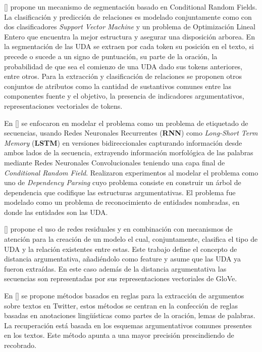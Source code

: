 [\cite{stab2017parsing}] propone un mecanismo de segmentación basado en Conditional Random Fields. La clasificación
y predicción de relaciones es modelado conjuntamente como con dos clasificadores \emph{Support Vector Machine} y un problema
de Optimización Lineal Entero que encuentra la mejor estructura y asegurar una disposición arborea. En la segmentación
de las UDA se extraen por cada token su posición en el texto, si precede o sucede a un signo de puntuación, su parte de
la oración, la probabilidad de que sea el comienzo de una UDA dado sus tokens anteriores, entre otros. Para la extracción
y clasificación de relaciones se proponen otros conjuntos de atributos como la cantidad de sustantivos comunes entre
las componentes fuente y el objetivo, la presencia de indicadores argumentativos, representaciones vectoriales de tokens.

En [\cite{eger2017neural}] se enfocaron en
modelar el problema como un problema de etiquetado de secuencias, usando Redes Neuronales Recurrentes (\textbf{RNN}) como 
\emph{Long-Short Term Memory} (\textbf{LSTM}) en versiones bidireccionales capturando información desde ambos lados de la secuencia,
extrayendo información morfológica de las palabras mediante Redes Neuronales Convolucionales teniendo una capa final de
\emph{Conditional Random Field}. Realizaron experimentos al modelar el problema como uno de \emph{Dependency Parsing} cuyo problema
consiste en construir un árbol de dependencia que codifique las estructuras argumentativas. El problema fue modelado
como un problema de reconocimiento de entidades nombradas, en donde las entidades son las UDA.

[\cite{galassi2018argumentative}] propone el uso de redes residuales y en combinación con mecanismos de atención
para la creación de un modelo el cual, conjuntamente, clasifica el tipo de UDA y la relación existentes entre estas.
Este trabajo define el concepto de distancia argumentativa, añadiéndolo como feature y asume que las UDA ya fueron 
extraídas. En este caso además de la distancia argumentativa las secuencias son representadas por sus representaciones
vectoriales de GloVe.

En [\cite{dykes2020reconstructing}] se propone métodos basados en reglas para la extracción de argumentos sobre
textos en Twitter, estos métodos se centran en la confección de reglas basadas en anotaciones lingüísticas como
partes de la oración, lemas de palabras. La recuperación está basada en los esquemas argumentativos comunes presentes
en los textos. Este método apunta a una mayor precisión prescindiendo de recobrado. 


